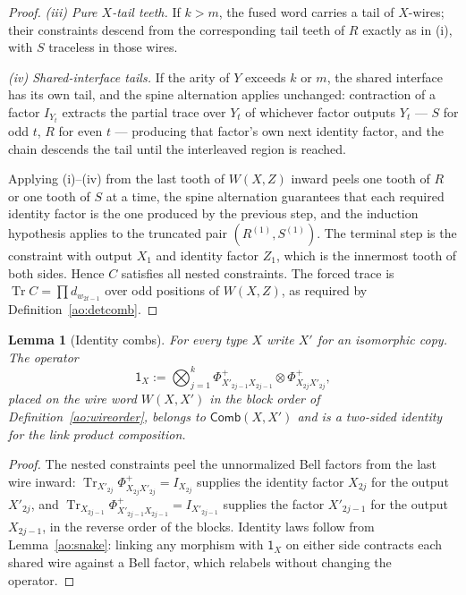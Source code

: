 \documentclass[11pt,a4paper]{article}
\theoremstyle{definition}
\theoremstyle{plain}
\newtheorem{lemma}[theorem]{Lemma}
\theoremstyle{remark}
\DeclareMathOperator{\Tr}{Tr}
\newcommand{\Comb}{\mathsf{Comb}}
\begin{document}
\begin{proof}
\emph{(iii) Pure $X$-tail teeth.} If $k>m$, the fused word carries a tail of
$X$-wires; their constraints descend from the corresponding tail teeth of
$R$ exactly as in (i), with $S$ traceless in those wires.

\emph{(iv) Shared-interface tails.} If the arity of $Y$ exceeds $k$ or $m$,
the shared interface has its own tail, and the spine alternation applies
unchanged: contraction of a factor $I_{Y_t}$ extracts the partial trace over
$Y_t$ of whichever factor outputs $Y_t$ --- $S$ for odd $t$, $R$ for even
$t$ --- producing that factor's own next identity factor, and the chain
descends the tail until the interleaved region is reached.

Applying (i)--(iv) from the last tooth of $W(X,Z)$ inward peels one tooth
of $R$ or one tooth of $S$ at a time, the spine alternation guarantees that
each required identity factor is the one produced by the previous step, and
the induction hypothesis applies to the truncated pair
$(R^{(1)},S^{(1)})$. The terminal step is the constraint with output $X_1$
and identity factor $Z_1$, which is the innermost tooth of both sides.
Hence $C$ satisfies all nested constraints. The forced trace is
$\Tr C=\prod d_{w_{2t-1}}$ over odd positions of $W(X,Z)$, as required by
Definition~\ref{ao:detcomb}.
\end{proof}

\begin{lemma}[Identity combs]
\label{ao:identities}
For every type $X$ write $X'$ for an isomorphic copy. The operator
\[
\mathsf 1_X := \bigotimes_{j=1}^{k}
\Phi^+_{X'_{2j-1}X_{2j-1}}\otimes\Phi^+_{X_{2j}X'_{2j}},
\]
placed on the wire word $W(X,X')$ in the block order of
Definition~\ref{ao:wireorder}, belongs to $\Comb(X,X')$ and is a two-sided
identity for the link product composition.
\end{lemma}

\begin{proof}
The nested constraints peel the unnormalized Bell factors from the last wire
inward: $\Tr_{X'_{2j}}\Phi^+_{X_{2j}X'_{2j}}=I_{X_{2j}}$ supplies the
identity factor $X_{2j}$ for the output $X'_{2j}$, and
$\Tr_{X_{2j-1}}\Phi^+_{X'_{2j-1}X_{2j-1}}=I_{X'_{2j-1}}$ supplies the factor
$X'_{2j-1}$ for the output $X_{2j-1}$, in the reverse order of the blocks.
Identity laws follow from Lemma~\ref{ao:snake}: linking any morphism with
$\mathsf 1_X$ on either side contracts each shared wire against a Bell
factor, which relabels without changing the operator.
\end{proof}
\end{document}
